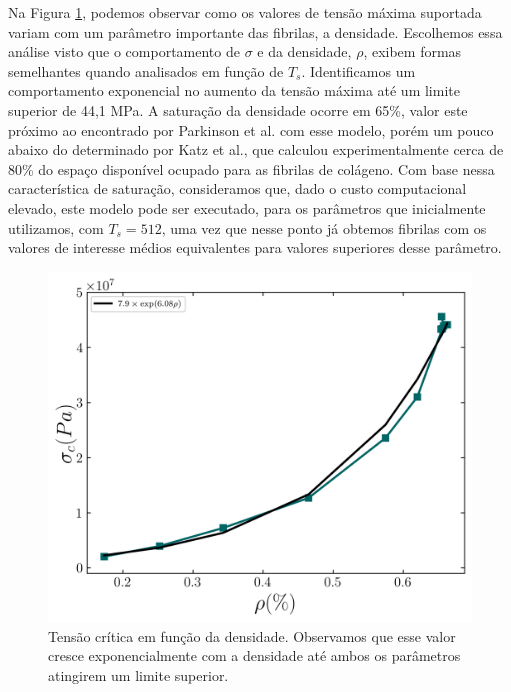 \documentclass{article}
\begin{document}
    Na Figura \ref{R6}, podemos observar como os valores de tensão máxima suportada variam com um parâmetro 
    importante das fibrilas, a densidade. Escolhemos essa análise visto que o comportamento de \(\sigma\) e da 
    densidade, \(\rho\), exibem formas semelhantes quando analisados em função de \(T_{s}\). Identificamos um 
    comportamento exponencial no aumento da tensão máxima até um limite superior de 44,1 MPa. A saturação da 
    densidade ocorre em 65\%, valor este próximo ao encontrado por Parkinson et al.\cite{Parkinson1995} com esse 
    modelo, porém um pouco abaixo do determinado por Katz et al.\cite{KATZ1973351}, que calculou experimentalmente 
    cerca de 80\% do espaço disponível ocupado para as fibrilas de colágeno. Com base nessa característica de 
    saturação, consideramos que, dado o custo computacional elevado, este modelo pode ser executado, para os parâmetros 
    que inicialmente utilizamos, com \(T_{s}=512\), uma vez que nesse ponto já obtemos fibrilas com os valores de 
    interesse médios equivalentes para valores superiores desse parâmetro. 



    \begin{figure}[H]
        \centering
        \includegraphics[width=\textwidth]{figures/sigma_rho.png}

        \caption{Tensão crítica em função da densidade. Observamos que esse valor cresce exponencialmente com a 
        densidade até ambos os parâmetros atingirem um limite superior.} 


        \label{R6}
    \end{figure}
\end{document}
